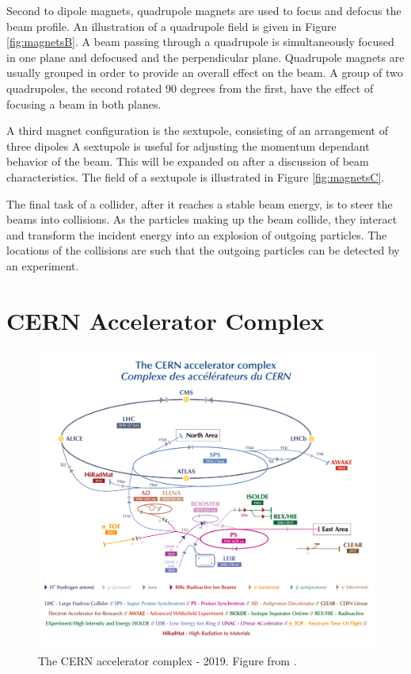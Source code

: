 Second to dipole magnets, quadrupole magnets are used to focus and defocus the beam profile.
An illustration of a quadrupole field is given in Figure \ref{fig:magnetsB}.
A beam passing through a quadrupole is simultaneously focused in one plane and defocused and the perpendicular plane.
Quadrupole magnets are usually grouped in order to provide an overall effect on the beam.
A group of two quadrupoles, the second rotated 90 degrees from the first, have the effect of focusing a beam in both planes.

A third magnet configuration is the sextupole, consisting of an arrangement of three dipoles
A sextupole is useful for adjusting the momentum dependant behavior of the beam. This will be expanded on after a discussion of beam characteristics.
The field of a sextupole is illustrated in Figure \ref{fig:magnetsC}.

The final task of a collider, after it reaches a stable beam energy, is to steer the beams into collisions.
As the particles making up the beam collide, they interact and transform the incident energy into an explosion of outgoing particles.
The locations of the collisions are such that the outgoing particles can be detected by an experiment.

\section{CERN Accelerator Complex}

\begin{figure}[h!]
\captionsetup[subfigure]{position=b}
\centering
\includegraphics[width=1.0\textwidth]{figures/experiment/accelComplex-small.png}
\caption{The CERN accelerator complex - 2019. Figure from \cite{accelComplex}.}
\label{fig:accelComplex}
\end{figure}

